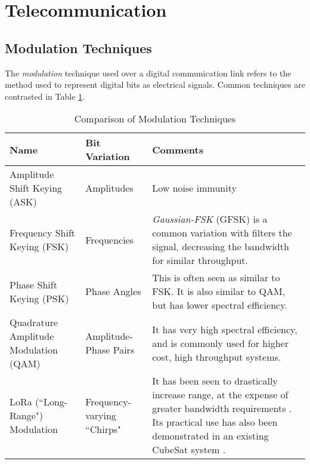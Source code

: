 \section{Telecommunication}\label{sec:telecommunication_theory}

\subsection{Modulation Techniques}
The \textit{modulation} technique used over a digital communication link refers to the method used to represent digital bits as electrical signals. Common techniques are contrasted in Table \ref{tab:modulationTechniques}.

\begin{table}[!htb]
  \centering
  \renewcommand{\arraystretch}{1.2}
  \hspace*{-1cm}
  \begin{tabular}{ |p{3cm}|p{2cm}|p{11cm}| }
  \hline
  \textbf{Name}                & \textbf{Bit Variation}    & \textbf{Comments} \\ \hline
   Amplitude Shift Keying (ASK)
   & Amplitudes
   & Low noise immunity
   \\ \hline
   Frequency Shift Keying (FSK)
   & Frequencies
   & \textit{Gaussian-FSK} (GFSK) is a common variation with filters the signal, decreasing the bandwidth for similar throughput.
   \\ \hline
   Phase Shift Keying (PSK)
   & Phase Angles
   & This is often seen as similar to FSK. It is also similar to QAM, but has lower spectral efficiency.
   \\ \hline
   Quadrature Amplitude Modulation (QAM)
   & Amplitude-Phase Pairs
   & It has very high spectral efficiency, and is commonly used for higher cost, high throughput systems.
   \\ \hline
   LoRa (``Long-Range") Modulation
   & Frequency-varying ``Chirps"
   & It has been seen to drastically increase range, at the expense of greater bandwidth requirements \cite{datasheet-SX1278}. Its practical use has also been demonstrated in an existing CubeSat system \cite{design-FOSSASATLink}.
   \\ \hline
  \end{tabular}
  \caption{Comparison of Modulation Techniques}
  \label{tab:modulationTechniques}
\end{table}

